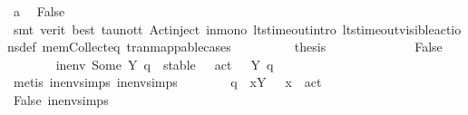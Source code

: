 \begin{isabellebody}
\ a{}\ \isamarkupfalse%
\ False\isanewline
\ \ \ \ \ \ \ \ \isamarkupfalse%
\ {\isacharparenleft}{\kern0pt}smt\ {\isacharparenleft}{\kern0pt}verit{\isacharcomma}{\kern0pt}\ best{\isacharparenright}{\kern0pt}\ tau{\isacharunderscore}{\kern0pt}not{\isacharunderscore}{\kern0pt}t\ Act{\isacharunderscore}{\kern0pt}{\isasymtheta}{\isachardot}{\kern0pt}inject{\isacharparenleft}{\kern0pt}{}{\isacharparenright}{\kern0pt}\ in{\isacharunderscore}{\kern0pt}mono\ lts{\isacharunderscore}{\kern0pt}timeout{\isachardot}{\kern0pt}intro\ lts{\isacharunderscore}{\kern0pt}timeout{\isachardot}{\kern0pt}visible{\isacharunderscore}{\kern0pt}actions{\isacharunderscore}{\kern0pt}def\ mem{\isacharunderscore}{\kern0pt}Collect{\isacharunderscore}{\kern0pt}eq\ tran{\isacharunderscore}{\kern0pt}mappable{\isachardot}{\kern0pt}cases{\isacharparenright}{\kern0pt}\isanewline
\ \ \ \ \ \ \isamarkupfalse%
\ \isamarkupfalse%
\ {\isacharquery}{\kern0pt}thesis\ \isacommand{{\isachardot}{\kern0pt}{\isachardot}{\kern0pt}}\isamarkupfalse%
\isanewline
\ \ \ \ \isamarkupfalse%
\isanewline
\ \ \ \ \ \ \isamarkupfalse%
\ False\isanewline
\ \ \ \ \ \ \isamarkupfalse%
\ {\isacartoucheopen}in{\isacharunderscore}{\kern0pt}env\ {\isacharparenleft}{\kern0pt}Some\ Y{\isacharparenright}{\kern0pt}\ q\ {\isacharequal}{\kern0pt}\ stable\ {\isacharbraceleft}{\kern0pt}{\isasymalpha}\ {\isachardot}{\kern0pt}\ act\ {\isasymalpha}\ {\isasymin}\ Y{\isacharbraceright}{\kern0pt}\ q{\isacartoucheclose}\isanewline
\ \ \ \ \ \ \ \ \isamarkupfalse%
\ {\isacharparenleft}{\kern0pt}metis\ in{\isacharunderscore}{\kern0pt}env{\isachardot}{\kern0pt}simps{\isacharparenleft}{\kern0pt}{}{\isacharparenright}{\kern0pt}\ in{\isacharunderscore}{\kern0pt}env{\isachardot}{\kern0pt}simps{\isacharparenleft}{\kern0pt}{}{\isacharparenright}{\kern0pt}{\isacharparenright}{\kern0pt}\isanewline
\ \ \ \ \ \ \isamarkupfalse%
\ q{}{\isacharcolon}{\kern0pt}\ {\isacartoucheopen}{\isasymforall}\ x{\isasymin}Y{\isachardot}{\kern0pt}\ {\isacharparenleft}{\kern0pt}{\isasymexists}\ {\isasymalpha}{\isachardot}{\kern0pt}\ x\ {\isacharequal}{\kern0pt}\ act\ {\isasymalpha}{\isacharparenright}{\kern0pt}{\isacartoucheclose}\isanewline
\ \ \ \ \ \ \ \ \isamarkupfalse%
\ {\isachardoublequoteopen}False{\isachardoublequoteclose}\ in{\isacharunderscore}{\kern0pt}env{\isachardot}{\kern0pt}simps{\isacharparenleft}{\kern0pt}{}{\isacharparenright}{\kern0pt}\ \isamarkupfalse%

\end{isabellebody}
